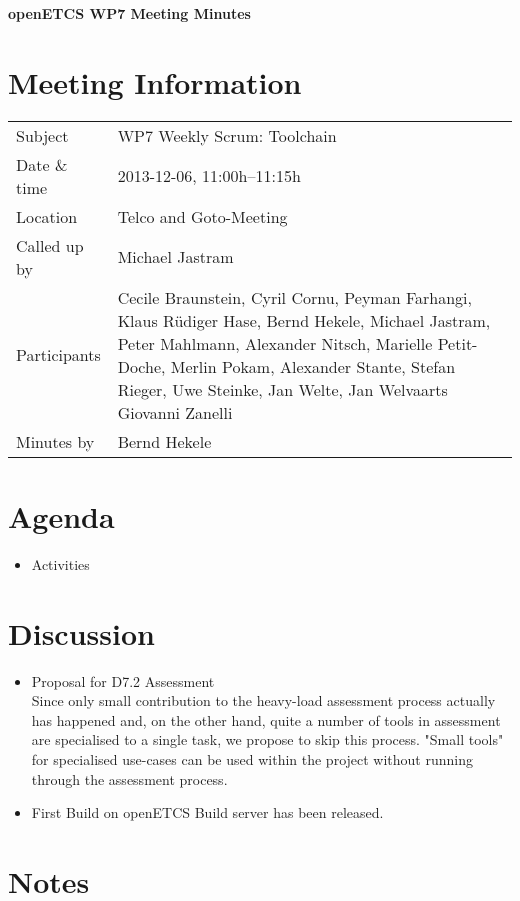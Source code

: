 \documentclass[a4paper, 11pt]{article}
\begin{document}
{\begin{center}\huge\bf openETCS WP7 Meeting Minutes\end{center}}
\section{Meeting Information}

\renewcommand{\arraystretch}{1.5}
\begin{supertabular}{m{.2\textwidth}m{.8\textwidth}}
Subject & WP7 Weekly Scrum: Toolchain\\
Date \& time & 2013-12-06, 11:00h--11:15h\\
Location & Telco and Goto-Meeting\\
Called up by & Michael Jastram\\
Participants &
Cecile Braunstein,
Cyril Cornu,
Peyman Farhangi,
Klaus R\"udiger Hase,
Bernd Hekele,
Michael Jastram,
Peter Mahlmann,
Alexander Nitsch,
Marielle Petit-Doche,
Merlin Pokam,
Alexander Stante,
Stefan Rieger,
Uwe Steinke,
Jan Welte,
Jan Welvaarts
Giovanni Zanelli
\\

Minutes by & Bernd Hekele\\

\end{supertabular}
\renewcommand{\arraystretch}{1.0}


\section{Agenda}
\begin{itemize}
\item Activities
\end{itemize}

\section{Discussion}

\begin{itemize}
\item Proposal for D7.2 Assessment\\
Since only small contribution to the heavy-load assessment process actually has happened and, on the other hand, quite  a number of tools in assessment are specialised to a single task, we propose to skip this process. "Small tools" for specialised use-cases can be used within the project without running through the assessment process.

\item First Build on openETCS Build server has been released.\\




\end{itemize}

\section{Notes}
\end{document}
